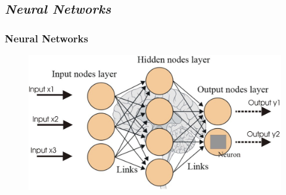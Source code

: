 \subsection[Neural Networks]{\textit{Neural Networks}}


%
%
%

\begin{frame}

	\frametitle{Neural Networks}

	\begin{figure}[!htbp]
		\centering
		\includegraphics[width=1.00\linewidth]{images/supervised/z_algorithms_neural_networks/neural_network.jpg}
	\end{figure}

\end{frame}


